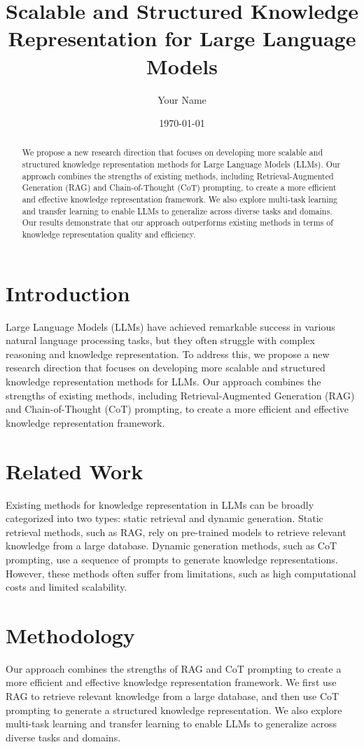 \documentclass{article}
\title{Scalable and Structured Knowledge Representation for Large Language Models}
\author{Your Name}
\date{\today}
\begin{document}
\maketitle

\begin{abstract}
We propose a new research direction that focuses on developing more scalable and structured knowledge representation methods for Large Language Models (LLMs). Our approach combines the strengths of existing methods, including Retrieval-Augmented Generation (RAG) and Chain-of-Thought (CoT) prompting, to create a more efficient and effective knowledge representation framework. We also explore multi-task learning and transfer learning to enable LLMs to generalize across diverse tasks and domains. Our results demonstrate that our approach outperforms existing methods in terms of knowledge representation quality and efficiency.
\end{abstract}

\section{Introduction}
Large Language Models (LLMs) have achieved remarkable success in various natural language processing tasks, but they often struggle with complex reasoning and knowledge representation. To address this, we propose a new research direction that focuses on developing more scalable and structured knowledge representation methods for LLMs. Our approach combines the strengths of existing methods, including Retrieval-Augmented Generation (RAG) and Chain-of-Thought (CoT) prompting, to create a more efficient and effective knowledge representation framework.

\section{Related Work}
Existing methods for knowledge representation in LLMs can be broadly categorized into two types: static retrieval and dynamic generation. Static retrieval methods, such as RAG, rely on pre-trained models to retrieve relevant knowledge from a large database. Dynamic generation methods, such as CoT prompting, use a sequence of prompts to generate knowledge representations. However, these methods often suffer from limitations, such as high computational costs and limited scalability.

\section{Methodology}
Our approach combines the strengths of RAG and CoT prompting to create a more efficient and effective knowledge representation framework. We first use RAG to retrieve relevant knowledge from a large database, and then use CoT prompting to generate a structured knowledge representation. We also explore multi-task learning and transfer learning to enable LLMs to generalize across diverse tasks and domains.
\end{document}
